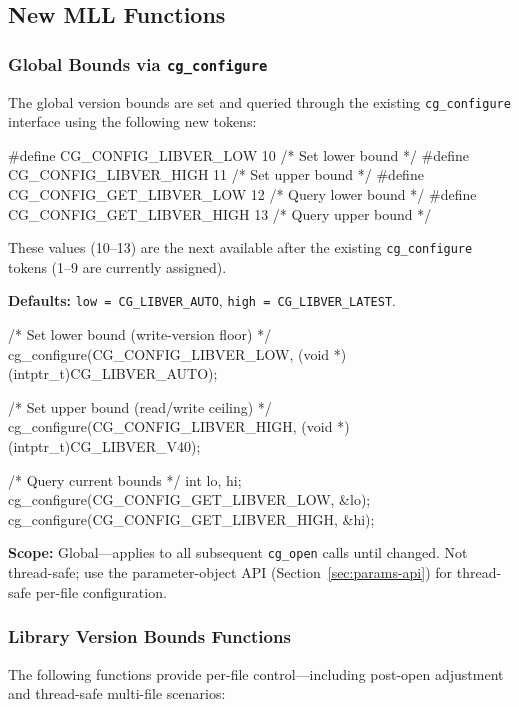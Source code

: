 \documentclass[11pt,letterpaper]{article}
\makeatletter
\let\cgns@orig@lstlisting\lstlisting
\let\cgns@endorig@lstlisting\endlstlisting
\renewenvironment{lstlisting}
  {\par\needspace{5\baselineskip}\nolinenumbers\cgns@orig@lstlisting}
  {\cgns@endorig@lstlisting\par\linenumbers}
\makeatother
\begin{document}
\subsection{New MLL Functions}

\subsubsection{Global Bounds via \texttt{cg\_configure}}

The global version bounds are set and queried through the existing
\texttt{cg\_configure} interface using the following new tokens:

\begin{lstlisting}[language=C]
#define CG_CONFIG_LIBVER_LOW       10  /* Set lower bound */
#define CG_CONFIG_LIBVER_HIGH      11  /* Set upper bound */
#define CG_CONFIG_GET_LIBVER_LOW   12  /* Query lower bound */
#define CG_CONFIG_GET_LIBVER_HIGH  13  /* Query upper bound */
\end{lstlisting}

\noindent These values (10--13) are the next available after the
existing \texttt{cg\_configure} tokens (1--9 are currently assigned).

\textbf{Defaults:} \texttt{low~=~CG\_LIBVER\_AUTO},
\texttt{high~=~CG\_LIBVER\_LATEST}.

\begin{lstlisting}[language=C]
/* Set lower bound (write-version floor) */
cg_configure(CG_CONFIG_LIBVER_LOW,
             (void *)(intptr_t)CG_LIBVER_AUTO);

/* Set upper bound (read/write ceiling) */
cg_configure(CG_CONFIG_LIBVER_HIGH,
             (void *)(intptr_t)CG_LIBVER_V40);

/* Query current bounds */
int lo, hi;
cg_configure(CG_CONFIG_GET_LIBVER_LOW,  &lo);
cg_configure(CG_CONFIG_GET_LIBVER_HIGH, &hi);
\end{lstlisting}

\textbf{Scope:}  Global---applies to all subsequent \texttt{cg\_open}
calls until changed.  Not thread-safe; use the parameter-object API
(Section~\ref{sec:params-api}) for thread-safe per-file configuration.

\subsubsection{Library Version Bounds Functions}

The following functions provide per-file control---including post-open
adjustment and thread-safe multi-file scenarios:
\end{document}
